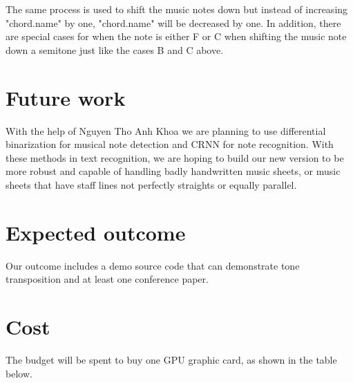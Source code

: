 \documentclass[a4paper,12pt]{report}
\begin{document}
The same process is used to shift the music notes down but instead of increasing
"chord.name" by one, "chord.name" will be decreased by one. In addition, there are
special cases for when the note is either F or C when shifting the music note
down a semitone just like the cases B and C above.


\section{Future work}
With the help of Nguyen Tho Anh Khoa we are
planning to use differential binarization for musical note detection and CRNN
for note recognition. With these methods in text recognition, we are hoping to
build our new version to be more robust and capable of handling badly handwritten music
sheets, or music sheets that have staff lines not perfectly straights or
equally parallel.\\


\section{Expected outcome}




Our outcome includes a demo source code that can demonstrate tone transposition and at least one conference
paper. 

\clearpage

\section{Cost}
The budget will be spent to buy one GPU graphic card, as shown in the table below.
\end{document}

